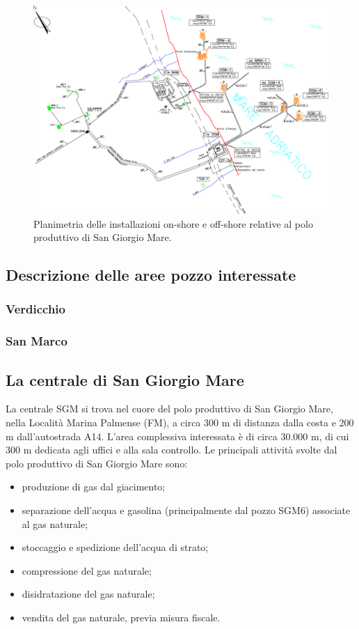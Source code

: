 \begin{landscape}
	\begin{figure}[htbp]
    	\centering
    	\includegraphics[width=\textwidth]{fig/test/asset.eps}
    	\caption{Planimetria delle installazioni on-shore e off-shore relative al polo produttivo di San Giorgio Mare.}
    	\label{fig:asset}
	\end{figure}
\end{landscape}

\subsection{Descrizione delle aree pozzo interessate}
\subsubsection{Verdicchio}
\subsubsection{San Marco}

\subsection{La centrale di San Giorgio Mare}
La centrale SGM si trova nel cuore del polo produttivo di San Giorgio Mare, nella Località Marina Palmense (FM), a circa 300 m di distanza dalla costa e 200 m dall'autostrada A14. L'area complessiva interessata è di circa 30.000 m, di cui 300 m dedicata agli uffici e alla sala controllo.
Le principali attività svolte dal polo produttivo di San Giorgio Mare sono:
\begin{itemize}
 	\item produzione di gas dal giacimento;
 	\item separazione dell'acqua e gasolina (principalmente dal pozzo SGM6) associate al gas naturale;
 	\item stoccaggio e spedizione dell'acqua di strato;
 	\item compressione del gas naturale;
 	\item disidratazione del gas naturale;
 	\item vendita del gas naturale, previa misura fiscale.
\end{itemize}

